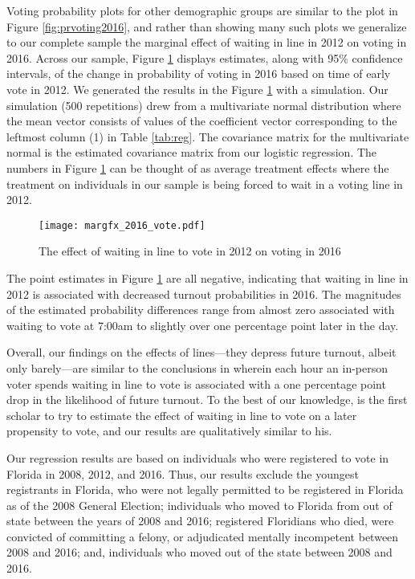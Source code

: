 \documentclass[12pt,titlepage]{article}
\begin{document}
Voting probability plots for other demographic groups are similar to
the plot in Figure \ref{fig:prvoting2016}, and rather than showing
many such plots we generalize to our complete sample the marginal
effect of waiting in line in 2012 on voting in 2016.  Across our
sample, Figure \ref{fig:margfx2016} displays estimates, along with
95\% confidence intervals, of the change in probability of voting in
2016 based on time of early vote in 2012.  We generated the results in
the Figure \ref{fig:margfx2016} with a simulation.  Our simulation
(500 repetitions) drew from a multivariate normal distribution where
the mean vector consists of values of the coefficient vector
corresponding to the leftmost column (1) in Table \ref{tab:reg}.  The
covariance matrix for the multivariate normal is the estimated
covariance matrix from our logistic regression.  The numbers in Figure
\ref{fig:margfx2016} can be thought of as average treatment effects
where the treatment on individuals in our sample is being forced to
wait in a voting line in 2012.

%

\begin{figure}[!ht]
\caption{The effect of waiting in line to vote in 2012 on voting in 2016}
  \label{fig:margfx2016}
  \centering
    \centering\texttt{[image: margfx\_2016\_vote.pdf]}
\end{figure}


The point estimates in Figure \ref{fig:margfx2016} are all negative,
indicating that waiting in line in 2012 is associated with decreased
turnout probabilities in 2016.  The magnitudes of the estimated
probability differences range from almost zero associated with waiting
to vote at 7:00am to slightly over one percentage point later in the
day.

Overall, our findings on the effects of lines---they depress future
turnout, albeit only barely---are similar to the conclusions in
\citet{pettigrew:longlinesminorityprecincts} wherein each hour an
in-person voter spends waiting in line to vote is associated with a
one percentage point drop in the likelihood of future turnout.  To the
best of our knowledge,
\citeauthor{pettigrew:longlinesminorityprecincts} is the first scholar
to try to estimate the effect of waiting in line to vote on a later
propensity to vote, and our results are qualitatively similar to his.

Our regression results are based on individuals who were registered to
vote in Florida in 2008, 2012, and 2016.  Thus, our results exclude
the youngest registrants in Florida, who were not legally permitted to
be registered in Florida as of the 2008 General Election; individuals
who moved to Florida from out of state between the years of 2008 and
2016; registered Floridians who died, were convicted of committing a
felony, or adjudicated mentally incompetent between 2008 and 2016;
and, individuals who moved out of the state between 2008 and 2016.
\end{document}
